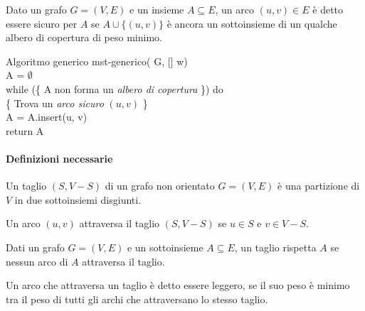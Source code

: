 \begin{definition}
    Dato un grafo $G=(V,E)$ e un insieme $A\subseteq E$, un arco $(u,v)\in E$ è
    detto essere sicuro per $A$ se $A\cup\{(u,v)\}$ è ancora un sottoinsieme di
    un qualche albero di copertura di peso minimo.
\end{definition}

\begin{minicode}{Algoritmo generico}
    \ind{} mst-generico( G, [] w)\\
         A = $\emptyset$\\
        \indf while (\{ A non forma un \emph{albero di copertura} \}) do\\
            \{ Trova un \emph{arco sicuro} $(u,v)$ \}\\
            A = A.insert(u, v)\\
        \indf return A
\end{minicode}

\paragraph{Definizioni necessarie}
\begin{definition}[Taglio]
    Un taglio $(S, V-S)$ di un grafo non orientato $G=(V,E)$ è una partizione di
    $V$ in due sottoinsiemi disgiunti.
\end{definition}
\begin{definition}
    Un arco $(u,v)$ attraversa il taglio $(S,V-S)$ se $u\in S$ e $v\in V-S$.
\end{definition}
\begin{definition}
    Dati un grafo $G=(V,E)$ e un sottoinsieme $A\subseteq E$, un taglio rispetta
    $A$ se nessun arco di $A$ attraversa il taglio.
\end{definition}
\begin{definition}
    Un arco che attraversa un taglio è detto essere leggero, se il suo peso è
    minimo tra il peso di tutti gli archi che attraversano lo stesso taglio.
\end{definition}

